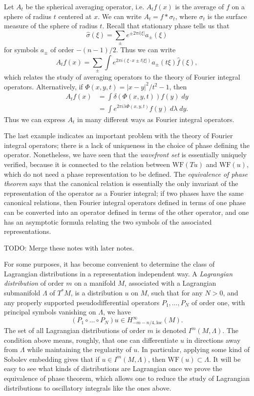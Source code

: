 \begin{example}
    Let $A_t$ be the spherical averaging operator, i.e. $A_t f(x)$ is the average of $f$ on a sphere of radius $t$ centered at $x$. We can write $A_t = f * \sigma_t$, where $\sigma_t$ is the surface measure of the sphere of radius $t$. Recall that stationary phase tells us that
    \[ \widehat{\sigma}(\xi) = \sum_{\pm} e^{\pm 2 \pi i |\xi|} a_{\pm}(\xi) \]
    for symbols $a_{\pm}$ of order $-(n-1)/2$. Thus we can write
    \[ A_t f(x) = \sum_{\pm} \int e^{2 \pi i(\xi \cdot x \pm t |\xi|)} a_{\pm}(t \xi) \widehat{f}(\xi), \]
    which relates the study of averaging operators to the theory of Fourier integral operators. Alternatively, if $\Phi(x,y,t) = |x - y|^2 / t^2 - 1$, then
    \begin{align*}
        A_t f(x) &= \int \delta(\Phi(x,y,t)) f(y)\; dy\\
        &= \int e^{2 \pi i \lambda \Phi(x,y,t)} f(y)\; d\lambda\; dy.
    \end{align*}
    Thus we can express $A_t$ in many different ways as Fourier integral operators.
\end{example}

The last example indicates an important problem with the theory of Fourier integral operators; there is a lack of uniqueness in the choice of phase defining the operator. Nonetheless, we have seen that the \emph{wavefront set} is essentially uniquely verified, because it is connected to the relation between $\text{WF}(Tu)$ and $\text{WF}(u)$, which do not need a phase representation to be defined. The \emph{equivalence of phase theorem} says that the canonical relation is essentially the only invariant of the representation of the operator as a Fourier integral; if two phases have the same canonical relations, then Fourier integral operators defined in terms of one phase can be converted into an operator defined in terms of the other operator, and one has an asymptotic formula relating the two symbols of the associated representations.

TODO: Merge these notes with later notes.

For some purposes, it has become convenient to determine the class of Lagrangian distributions in a representation independent way. A \emph{Lagrangian distribution} of order $m$ on a manifold $M$, associated with a Lagrangian submanifold $\Lambda$ of $T^*M$, is a distribution $u$ on $M$, such that for any $N > 0$, and any properly supported pseudodifferential operators $P_1,\dots,P_N$ of order one, with principal symbols vanishing on $\Lambda$, we have
%
\[ (P_1 \circ \dots \circ P_N) u \in H^\infty_{-m-n/4, \text{loc}}(M). \]
%
The set of all Lagrangian distributions of order $m$ is denoted $I^m(M,\Lambda)$. The condition above means, roughly, that one can differentiate $u$ in directions away from $\Lambda$ while maintaining the regularity of $u$. In particular, applying some kind of Sobolev embedding gives that if $u \in I^m(M,\Lambda)$, then $\text{WF}(u) \subset \Lambda$. It will be easy to see what kinds of distributions are Lagrangian once we prove the equivalence of phase theorem, which allows one to reduce the study of Lagrangian distributions to oscillatory integrals like the ones above.

